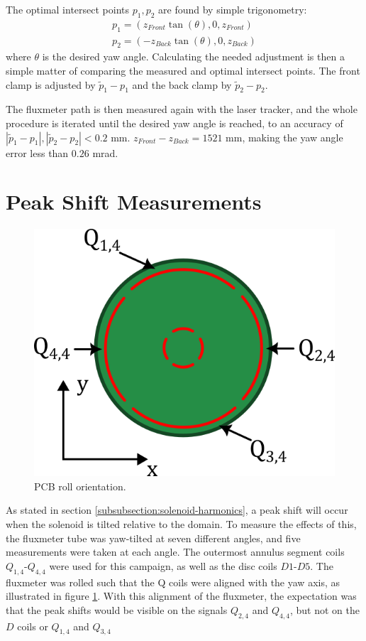 The optimal intersect points $p_1, p_2$
are found by simple trigonometry:
\begin{align}
    p_1 = (z_{Front}\tan(\theta), 0, z_{Front}) \\
    p_2 = (-z_{Back}\tan(\theta), 0, z_{Back})
\end{align}
where $\theta$ is the desired yaw angle. Calculating the needed
adjustment is then a simple matter of comparing the measured
and optimal intersect points. The front clamp is adjusted by
$\tilde{p}_1 - p_1$ and the back clamp by $\tilde{p}_2 - p_2$.

The fluxmeter path is then measured again with the laser tracker,
and the whole procedure is iterated until the desired yaw angle
is reached, to an accuracy of
$|\tilde{p}_1 - p_1|, |\tilde{p}_2 - p_2| < 0.2$ mm.
$z_{Front} - z_{Back} = 1521$ mm, making the yaw angle error
less than $0.26$ mrad.

\section{Peak Shift Measurements}
\label{sec:peak-shift-measurements}

\begin{figure}
    \centering
    \includegraphics[width=0.8\linewidth]{figs/pcborientation}
    \caption{PCB roll orientation.}
    \label{fig:pcbalignment}
\end{figure}

As stated in section \ref{subsubsection:solenoid-harmonics},
a peak shift will occur when the solenoid is tilted relative
to the domain. To measure the effects of this, the fluxmeter
tube was yaw-tilted at seven different angles, and five
measurements were taken at each angle. The outermost
annulus segment coils $Q_{1,4}$-$Q_{4,4}$ were used for this campaign,
as well as the disc coils $D1$-$D5$. The fluxmeter was rolled
such that the Q coils were aligned with the yaw axis, as illustrated
in figure \ref{fig:pcbalignment}. With this alignment of the fluxmeter,
the expectation was that the peak shifts would be visible on the
signals $Q_{2,4}$ and $Q_{4,4}$, but not on the $D$ coils or
$Q_{1,4}$ and $Q_{3,4}$

